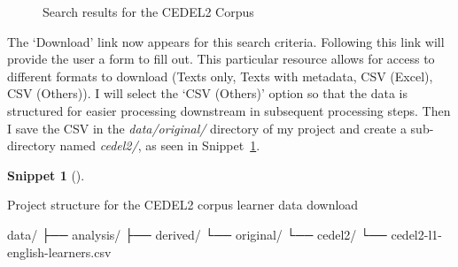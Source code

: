 \documentclass[
  letterpaper,
  krantz1]{latex/krantz-mod}
\newenvironment{Shaded}{\begin{snugshade}}{\end{snugshade}}
\newcommand{\ExtensionTok}[1]{\textcolor[rgb]{0.00,0.00,0.00}{#1}}
\newcommand{\NormalTok}[1]{\textcolor[rgb]{0.00,0.00,0.00}{#1}}
\theoremstyle{definition}
\newtheorem{definition}{Snippet}[chapter]
\theoremstyle{definition}
\theoremstyle{remark}
\begin{document}
\begin{figure}[!htb]


\caption{\label{fig-acquire-cedel2-results}Search results for the CEDEL2
Corpus}

\end{figure}%

The `Download' link now appears for this search criteria. Following this
link will provide the user a form to fill out. This particular resource
allows for access to different formats to download (Texts only, Texts
with metadata, CSV (Excel), CSV
(Others)). I will select the
`CSV (Others)' option so that the data is structured for easier
processing downstream in subsequent processing steps. Then I save the
CSV in the \emph{data/original/} directory of my project and create a
sub-directory named \emph{cedel2/}, as seen in
Snippet~\ref{def-acquire-cedel2-learners-download}.

\pagebreak

\begin{definition}[]\protect\hypertarget{def-acquire-cedel2-learners-download}{}\label{def-acquire-cedel2-learners-download}

Project structure for the CEDEL2 corpus learner data download

\begin{Shaded}
\begin{Highlighting}[]
\ExtensionTok{data/}
\ExtensionTok{├──}\NormalTok{ analysis/}
\ExtensionTok{├──}\NormalTok{ derived/}
\ExtensionTok{└──}\NormalTok{ original/}
    \ExtensionTok{└──}\NormalTok{ cedel2/}
        \ExtensionTok{└──}\NormalTok{ cedel2{-}l1{-}english{-}learners.csv}
\end{Highlighting}
\end{Shaded}

\end{definition}
\end{document}
